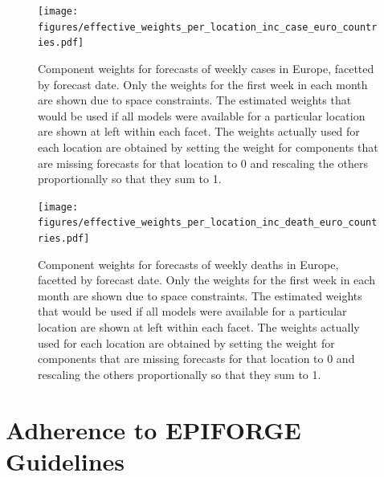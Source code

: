 \documentclass{article}
\begin{document}
\begin{figure}
  \texttt{[image: figures/effective\_weights\_per\_location\_inc\_case\_euro\_countries.pdf]}
  \caption{Component weights for forecasts of weekly cases in Europe, facetted by forecast date. Only the weights for the first week in each month are shown due to space constraints. The estimated weights that would be used if all models were available for a particular location are shown at left within each facet. The weights actually used for each location are obtained by setting the weight for components that are missing forecasts for that location to 0 and rescaling the others proportionally so that they sum to 1.}
  \label{fig:case_eu_effective_weights}
\end{figure}

\begin{figure}
  \texttt{[image: figures/effective\_weights\_per\_location\_inc\_death\_euro\_countries.pdf]}
  \caption{Component weights for forecasts of weekly deaths in Europe, facetted by forecast date. Only the weights for the first week in each month are shown due to space constraints. The estimated weights that would be used if all models were available for a particular location are shown at left within each facet. The weights actually used for each location are obtained by setting the weight for components that are missing forecasts for that location to 0 and rescaling the others proportionally so that they sum to 1.}
  \label{fig:death_eu_effective_weights}
\end{figure}

\newpage

\section{Adherence to EPIFORGE Guidelines}
\end{document}
